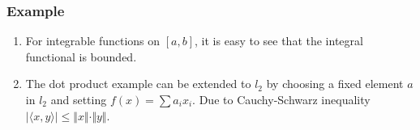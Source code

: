 \documentclass[11pt]{article}
\begin{document}
\subsubsection{Example}
\label{sec:org78ed98d}
\begin{enumerate}
\item For integrable functions on \([a, b]\), it is easy to see that the integral
functional is bounded.
\item The dot product example can be extended to \(l_2\) by choosing a fixed
element \(a\) in \(l_2\) and setting \(f(x) = \sum a_i x_i\). Due to
Cauchy-Schwarz inequality \(\vert \langle x, y\rangle\vert \le \Vert x
       \Vert \cdot \Vert y \Vert\).
\end{enumerate}
\end{document}
